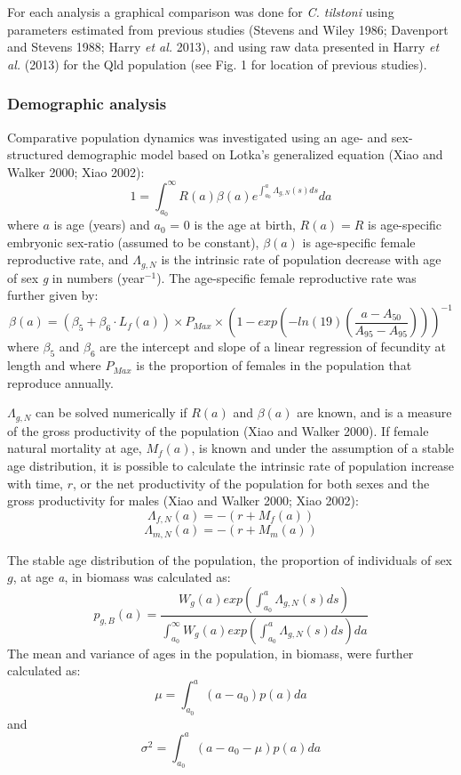 \documentclass[]{article}
\begin{document}
For each analysis a graphical comparison was done for \emph{C. tilstoni}
using parameters estimated from previous studies (Stevens and Wiley
1986; Davenport and Stevens 1988; Harry \emph{et al.} 2013), and using
raw data presented in Harry \emph{et al.} (2013) for the Qld population
(see Fig. 1 for location of previous studies).

\subsubsection{Demographic analysis}\label{demographic-analysis}

Comparative population dynamics was investigated using an age- and
sex-structured demographic model based on Lotka's generalized equation
(Xiao and Walker 2000; Xiao 2002):
\[1 = \int_{a_0}^{\infty}R(a)\beta(a)e^{\int_{a_0}^{a}\Lambda_{g, N}(s) ds}da\]
where \(a\) is age (years) and \(a_0\) = 0 is the age at birth,
\(R(a) = R\) is age-specific embryonic sex-ratio (assumed to be
constant), \(\beta(a)\) is age-specific female reproductive rate, and
\(\Lambda_{g, N}\) is the intrinsic rate of population decrease with age
of sex \emph{g} in numbers (year\(^{-1}\)). The age-specific female
reproductive rate was further given by:
\[\beta(a) = (\beta_5 + \beta_6 \cdot L_f(a)) \times P_{Max} \times (1 - exp( -ln(19)(\frac{a-A_{50}}{A_{95} - A_{95}})))^{-1}\]
where \(\beta_5\) and \(\beta_6\) are the intercept and slope of a
linear regression of fecundity at length and where \(P_{Max}\) is the
proportion of females in the population that reproduce annually.

\(\Lambda_{g,N}\) can be solved numerically if \(R(a)\) and \(\beta(a)\)
are known, and is a measure of the gross productivity of the population
(Xiao and Walker 2000). If female natural mortality at age, \(M_f(a)\),
is known and under the assumption of a stable age distribution, it is
possible to calculate the intrinsic rate of population increase with
time, \(r\), or the net productivity of the population for both sexes
and the gross productivity for males (Xiao and Walker 2000; Xiao 2002):
\[\Lambda_{f,N}(a) = -(r + M_f(a))\]
\[\Lambda_{m,N}(a) = -(r + M_m(a))\]

The stable age distribution of the population, the proportion of
individuals of sex \(g\), at age \emph{a}, in biomass was calculated as:
\[p_{g, B}(a) = \frac{W_{g}(a)exp(\int_{a_0}^{a}\Lambda_{g, N}(s) ds)}{\int_{a_0}^{\infty}W_{g}(a)exp(\int_{a_0}^{a}\Lambda_{g, N}(s) ds)da}\]
The mean and variance of ages in the population, in biomass, were
further calculated as: \[\mu = \int_{a_0}^{a}(a-a_0)p(a)da\] and
\[\sigma^2 = \int_{a_0}^{a}(a-a_0-\mu)p(a)da\]
\end{document}
